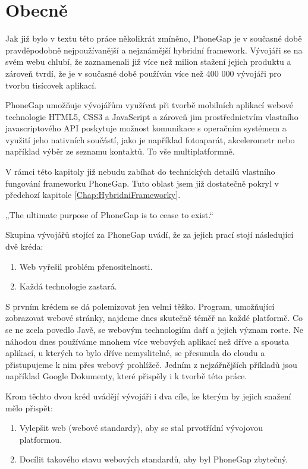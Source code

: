 \section{Obecně}
Jak již bylo v textu této práce několikrát zmíněno, PhoneGap je v současné době pravděpodobně nejpoužívanější a nejznámější hybridní framework. Vývojáři se na svém webu chlubí, že zaznamenali již více než milion stažení jejich produktu a zároveň tvrdí, že je v současné době používán více než 400 000 vývojáři pro tvorbu tisícovek aplikací.

PhoneGap umožňuje vývojářům využívat při tvorbě mobilních aplikací webové technologie HTML5, CSS3 a JavaScript a zároveň jim prostřednictvím vlastního javascriptového API poskytuje možnost komunikace s operačním systémem a využití jeho nativních součástí, jako je například fotoaparát, akcelerometr nebo například výběr ze seznamu kontaktů. To vše multiplatformně.

V rámci této kapitoly již nebudu zabíhat do technických detailů vlastního fungování frameworku PhoneGap. Tuto oblast jsem již dostatečně pokryl v předchozí kapitole \ref{Chap:HybridniFrameworky}.

„The ultimate purpose of PhoneGap is to cease to exist.“ \cite{how_cordova_becomes_phonegap}

Skupina vývojářů stojící za PhoneGap uvádí, že za jejich prací stojí následující dvě kréda:

\begin{enumerate}
	\item Web vyřešil problém přenositelnosti.
	\item Každá technologie zastará.
\end{enumerate}

S prvním krédem se dá polemizovat jen velmi těžko. Program, umožňující zobrazovat webové stránky, najdeme dnes skutečně téměř na každé platformě. Co se ne zcela povedlo Javě, se webovým technologiím daří a jejich význam roste. Ne náhodou dnes používáme mnohem více webových aplikací než dříve a spousta aplikací, u kterých to bylo dříve nemyslitelné, se přesunula do cloudu a přistupujeme k nim přes webový prohlížeč. Jedním z nejzářnějších příkladů jsou například Google Dokumenty, které přispěly i k tvorbě této práce.

Krom těchto dvou kréd uvádějí vývojáři i dva cíle, ke kterým by jejich snažení mělo přispět:

\begin{enumerate}
	\item Vylepšit web (webové standardy), aby se stal prvotřídní vývojovou platformou.
	\item Docílit takového stavu webových standardů, aby byl PhoneGap zbytečný.
\end{enumerate}

